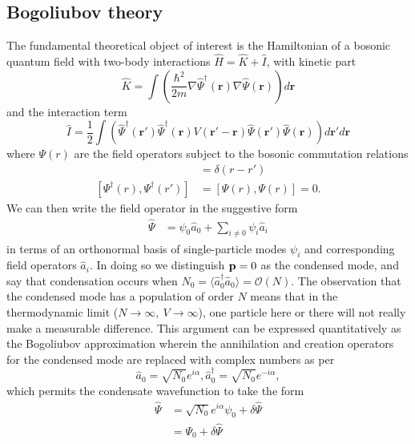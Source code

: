 	\subsection*{Bogoliubov theory}
	The fundamental theoretical object of interest is the Hamiltonian of a bosonic quantum field with two-body interactions $\hat{H} = \hat{K} + \hat{I}$, with kinetic part
	\begin{equation}
		\hat{K} = \int\left(\frac{\hbar^2}{2m}\nabla\hat{\Psi}^\dagger(\textbf{r})\nabla\hat{\Psi}(\textbf{r})\right)d\textbf{r}
		\label{eqn:ham1}
	\end{equation}
	and the interaction term
	\begin{equation}
		\hat{I} = \frac{1}{2}\int\left(\hat{\Psi}^\dagger(\textbf{r}')\hat{\Psi}^\dagger(\textbf{r})V(\textbf{r}'-\textbf{r}) \hat{\Psi}(\textbf{r}')\hat{\Psi}(\textbf{r})\right)d\textbf{r}'d\textbf{r}
		\label{eqn:ham2}
	\end{equation}
	where $\Psi(r)$ are the field operators subject to the bosonic commutation relations
	\begin{align}
		[\Psi(r),\Psi^\dagger(r')] &= \delta(r-r')\\
		 [\Psi^\dagger(r),\Psi^\dagger(r')]&=[\Psi(r),\Psi(r)]=0.
	\end{align}	
	We can then write the field operator in the suggestive form	
	\begin{align}
		\hat{\Psi} &= \psi_0 \hat{a}_0 + \sum_{i\neq0}\psi_i \hat{a}_i
	\end{align}
	in terms of an orthonormal basis of single-particle modes $\psi_i$ and corresponding field operators $\hat{a}_i$.
	In doing so we distinguish $\textbf{p}=0$ as the condensed mode, and say that condensation occurs when $N_0=\langle\hat{a}^\dagger_0\hat{a}_0\rangle =\mathcal{O}(N)$.
	The observation that the condensed mode has a population of order $N$ means that in the thermodynamic limit ($N\rightarrow\infty,~V\rightarrow\infty$), one particle here or there will not really make a measurable difference.
	This argument can be expressed quantitatively as the Bogoliubov approximation wherein the annihilation and creation operators for the condensed mode are replaced with complex numbers as per
	\begin{equation}
		\hat{a}_0 = \sqrt{N_0}e^{i\alpha}, \hat{a}_0^\dagger= \sqrt{N_0}e^{-i\alpha}, 
	\end{equation}
	which permits the condensate wavefunction to take the form
	\begin{align}
		\hat{\Psi} &= \sqrt{N_0}e^{i\alpha} \psi_0 + \delta\hat{\Psi}\\
					&= \Psi_0 + \delta\hat{\Psi}
	\end{align}


